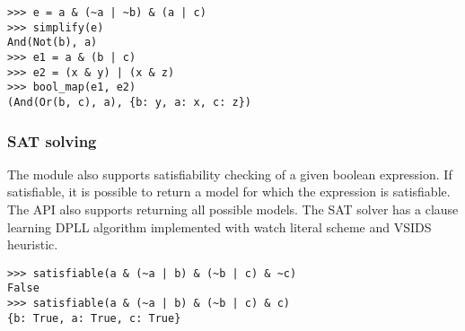\begin{verbatim}
>>> e = a & (~a | ~b) & (a | c)
>>> simplify(e)
And(Not(b), a)
>>> e1 = a & (b | c)
>>> e2 = (x & y) | (x & z)
>>> bool_map(e1, e2)
(And(Or(b, c), a), {b: y, a: x, c: z})
\end{verbatim}

\subsubsection{SAT solving}

The module also supports satisfiability checking of a given
boolean expression. If satisfiable, it is possible to return 
a model for which the expression is satisfiable. The API also
supports returning all possible models. The SAT solver has 
a clause learning DPLL algorithm implemented with watch 
literal scheme and VSIDS heuristic\cite{moskewicz2008method}.

\begin{verbatim}
>>> satisfiable(a & (~a | b) & (~b | c) & ~c)
False
>>> satisfiable(a & (~a | b) & (~b | c) & c)
{b: True, a: True, c: True}
\end{verbatim}
